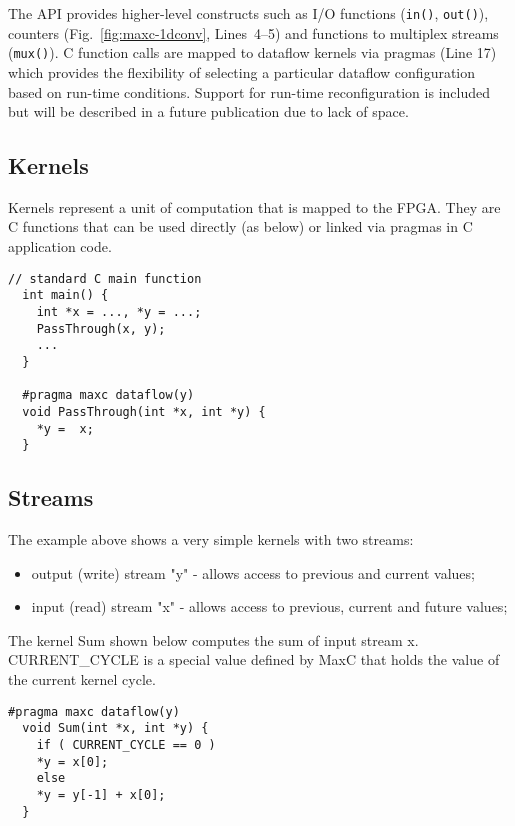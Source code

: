 The \FAST{} API provides higher-level constructs such as I/O functions
(\texttt{in()}, \texttt{out()}), counters (Fig.~\ref{fig:maxc-1dconv},
Lines~4--5) and functions to multiplex streams (\texttt{mux()}). C
function calls are mapped to dataflow kernels via pragmas (Line 17)
which provides the flexibility of selecting a particular dataflow
configuration based on run-time conditions. Support for run-time
reconfiguration is included but will be described in a future
publication due to lack of space.


\subsection{Kernels}

Kernels represent a unit of computation that is mapped to the FPGA.
They are C functions that can be used directly (as below) or linked
via pragmas in C application code.

\begin{lstlisting}[caption={Simple \FAST{} dataflow kernel.}]
  // standard C main function
  int main() {
    int *x = ..., *y = ...;
    PassThrough(x, y);
    ...
  }

  #pragma maxc dataflow(y)
  void PassThrough(int *x, int *y) {
    *y =  x;
  }
\end{lstlisting}

\subsection{Streams}
The example above shows a very simple kernels with two streams:

\begin{itemize}
\item output (write) stream "y" - allows access to previous and current values;
\item input (read) stream "x" - allows access to previous, current and future values;
\end{itemize}

The kernel Sum shown below computes the sum of input stream
x. CURRENT\_CYCLE is a special value defined by MaxC that holds the
value of the current kernel cycle.

\begin{lstlisting}[caption={\FAST{} kernel computing the sum of an input stream.}]
  #pragma maxc dataflow(y)
  void Sum(int *x, int *y) {
    if ( CURRENT_CYCLE == 0 )
    *y = x[0];
    else
    *y = y[-1] + x[0];
  }
\end{lstlisting}

